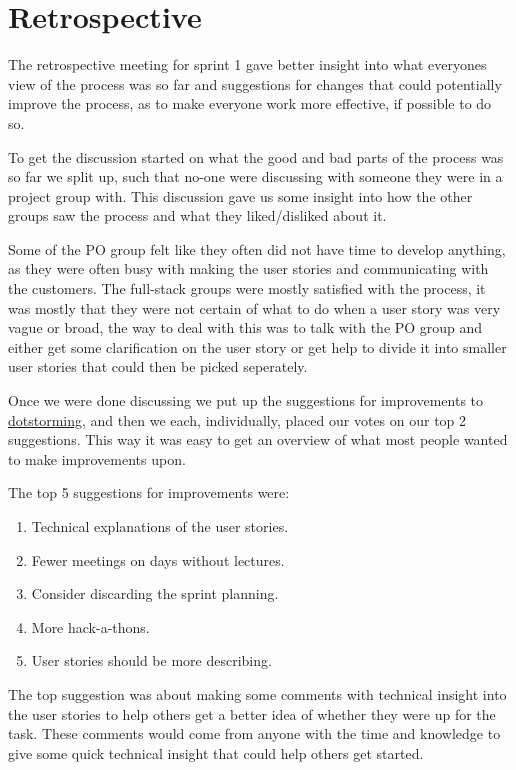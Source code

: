 \section{Retrospective}
The retrospective meeting for sprint 1 gave better insight into what everyones view of the process was so far and suggestions for changes that could potentially improve the process, as to make everyone work more effective, if possible to do so. 

To get the discussion started on what the good and bad parts of the process was so far we split up, such that no-one were discussing with someone they were in a project group with. 
This discussion gave us some insight into how the other groups saw the process and what they liked/disliked about it. 

Some of the PO group felt like they often did not have time to develop anything, as they were often busy with making the user stories and communicating with the customers. 
The full-stack groups were mostly satisfied with the process, it was mostly that they were not certain of what to do when a user story was very vague or broad, the way to deal with this was to talk with the PO group and either get some clarification on the user story or get help to divide it into smaller user stories that could then be picked seperately.

Once we were done discussing we put up the suggestions for improvements to \href{www.dotstorming.com}{dotstorming}, and then we each, individually, placed our votes on our top 2 suggestions.
This way it was easy to get an overview of what most people wanted to make improvements upon.

The top 5 suggestions for improvements were:
\begin{enumerate}
  \item Technical explanations of the user stories.
  \item Fewer meetings on days without lectures.
  \item Consider discarding the sprint planning.
  \item More hack-a-thons.
  \item User stories should be more describing.
\end{enumerate}

The top suggestion was about making some comments with technical insight into the user stories to help others get a better idea of whether they were up for the task.
These comments would come from anyone with the time and knowledge to give some quick technical insight that could help others get started. 

